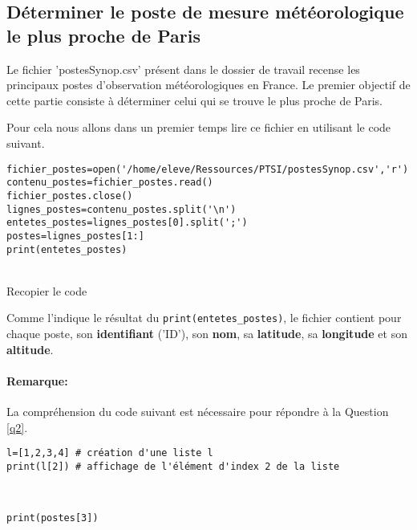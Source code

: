 \subsection{Déterminer le poste de mesure météorologique le plus proche de Paris}

Le fichier 'postesSynop.csv' présent dans le dossier de travail recense les principaux postes d'observation météorologiques en France. Le premier objectif de cette partie consiste à déterminer celui qui se trouve le plus proche de Paris.

Pour cela nous allons dans un premier temps lire ce fichier en utilisant le code suivant.

\begin{verbatim}
fichier_postes=open('/home/eleve/Ressources/PTSI/postesSynop.csv','r')
contenu_postes=fichier_postes.read()
fichier_postes.close()
lignes_postes=contenu_postes.split('\n')
entetes_postes=lignes_postes[0].split(';')
postes=lignes_postes[1:]
print(entetes_postes)
\end{verbatim}


\begin{solution}~\ \\
Recopier le code
\end{solution}

Comme l'indique le résultat du \verb?print(entetes_postes)?, le fichier contient pour chaque poste, son \textbf{identifiant} ('ID'), son \textbf{nom}, sa \textbf{latitude}, sa \textbf{longitude} et son \textbf{altitude}.

\paragraph{Remarque:}
La compréhension du code suivant est nécessaire pour répondre à la Question \ref{q2}.
\begin{verbatim}
l=[1,2,3,4] # création d'une liste l
print(l[2]) # affichage de l'élément d'index 2 de la liste
\end{verbatim}



\begin{solution}~\ \\
\begin{verbatim}
print(postes[3])
\end{verbatim}
\end{solution}

